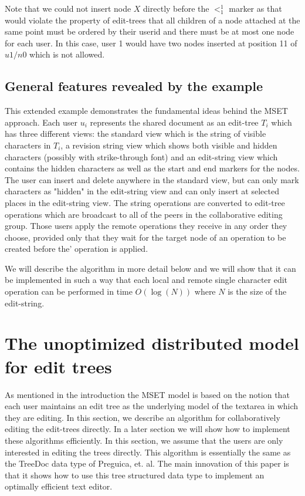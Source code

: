\documentclass{amsart}
\begin{document}
Note that we could not insert node $X$ directly before the $<^1_1$ marker
as that would violate the property of edit-trees that all children of a
node attached at the same point must be ordered by their userid and there
must be at most one node for each user. In this case, user 1 would have two
nodes inserted at position 11 of $u1/n0$ which is not allowed.

\subsection{General features revealed by the example}
This extended example demonstrates the fundamental ideas behind the MSET
approach. Each user $u_i$ represents the shared document as an edit-tree $T_i$
which has three different views: the standard view  which
is the string of visible characters in $T_i$, a revision string view which shows both visible and hidden characters (possibly with strike-through font) and an edit-string view which contains the hidden characters as well as the
start and end markers for the nodes. The user can insert and delete anywhere
in the standard view, but can only mark characters as "hidden" in the
edit-string view and can only insert at selected places in the edit-string
view. The string operations are converted to edit-tree operations which are
broadcast to all of the peers in the collaborative editing group. Those users
apply the remote operations they receive in any order they choose, provided only
that they wait for the target node of an operation to be created before the'
operation is applied.

We will describe the algorithm in more detail below and we will show that it
can be implemented in such a way that each local and remote single character 
edit operation
can be performed in time $O(\log(N))$ where $N$ is the size of the edit-string.



\section{The unoptimized distributed model for edit trees}
\label{sec:edittrees}

As mentioned in the introduction the MSET model is based on the notion that 
each user maintains an edit tree as the underlying model of the textarea in
which they are editing. In this section, we describe an algorithm for 
collaboratively editing the edit-trees directly. In a later section we will show 
how to implement these algorithms
efficiently. In this section, we assume that the users are only interested in editing
the trees directly. This algorithm is essentially the same as the TreeDoc data type of Preguica, et. al. The main innovation of this paper is that it shows how to use this tree structured data type to implement an optimally efficient text editor.
\end{document}
